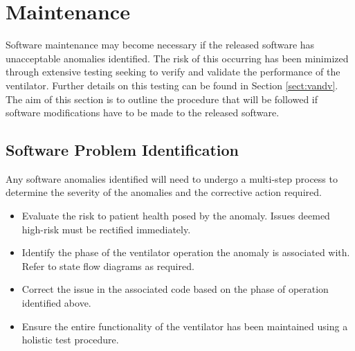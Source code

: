 \documentclass[]{article}
\begin{document}
\clearpage


\section{Maintenance}
\label{sect:maintenance}

Software maintenance may become necessary if the released software has unacceptable anomalies identified.  The risk of this occurring has been minimized through extensive testing seeking to verify and validate the performance of the ventilator.  Further details on this testing can be found in Section \ref{sect:vandv}.  The aim of this section is to outline the procedure that will be followed if software modifications have to be made to the released software.

\subsection{Software Problem Identification}
Any software anomalies identified will need to undergo a multi-step process to determine the severity of the anomalies and the corrective action required.

\begin{itemize}
	\item Evaluate the risk to patient health posed by the anomaly.  Issues deemed high-risk must be rectified immediately.
	\item Identify the phase of the ventilator operation the anomaly is associated with.  Refer to state flow diagrams as required.
	\item Correct the issue in the associated code based on the phase of operation identified above.
	\item Ensure the entire functionality of the ventilator has been maintained using a holistic test procedure.
\end{itemize}
\end{document}

